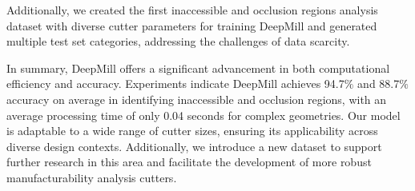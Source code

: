 Additionally, we created the first inaccessible and occlusion regions analysis dataset with diverse cutter parameters for training DeepMill and generated multiple test set categories, addressing the challenges of data scarcity.

In summary, DeepMill offers a significant advancement in both computational efficiency and accuracy. 
Experiments indicate DeepMill achieves 94.7$\%$ and 88.7$\%$ accuracy on average in identifying inaccessible and occlusion regions, with an average processing time of only 0.04 seconds for complex geometries.
Our model is adaptable to a wide range of cutter sizes, ensuring its applicability across diverse design contexts. 
Additionally, we introduce a new dataset to support further research in this area and facilitate the development of more robust manufacturability analysis cutters.





\begin{comment}





5. Challenges in Tool Accessibility Prediction
Identify challenges specific to tool accessibility prediction, such as:
Representing diverse tool geometries and orientations.
Capturing intricate interactions between tools and complex 3D surfaces.
Balancing prediction accuracy with computational efficiency.
Set the stage for how your work addresses these challenges.

\end{comment}
